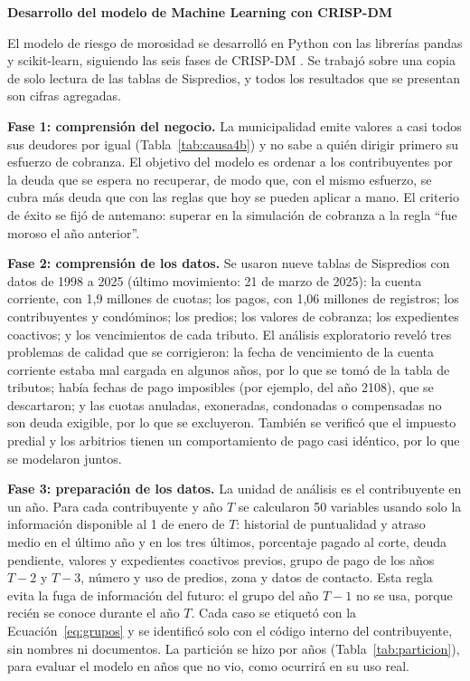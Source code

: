 \documentclass[12pt,a4paper]{report}
\newcommand{\subtitulo}[1]{\par\vspace{4pt}\noindent\textbf{#1}\par}
\begin{document}
\subtitulo{Desarrollo del modelo de Machine Learning con CRISP-DM}
\label{sec:crisp}

El modelo de riesgo de morosidad se desarrolló en Python con las librerías pandas y scikit-learn, siguiendo las seis fases de CRISP-DM \parencite{chapman2000}. Se trabajó sobre una copia de solo lectura de las tablas de Sispredios, y todos los resultados que se presentan son cifras agregadas.

\noindent\textbf{Fase 1: comprensión del negocio.} La municipalidad emite valores a casi todos sus deudores por igual (Tabla~\ref{tab:causa4b}) y no sabe a quién dirigir primero su esfuerzo de cobranza. El objetivo del modelo es ordenar a los contribuyentes por la deuda que se espera no recuperar, de modo que, con el mismo esfuerzo, se cubra más deuda que con las reglas que hoy se pueden aplicar a mano. El criterio de éxito se fijó de antemano: superar en la simulación de cobranza a la regla ``fue moroso el año anterior''.

\noindent\textbf{Fase 2: comprensión de los datos.} Se usaron nueve tablas de Sispredios con datos de 1998 a 2025 (último movimiento: 21 de marzo de 2025): la cuenta corriente, con 1,9 millones de cuotas; los pagos, con 1,06 millones de registros; los contribuyentes y condóminos; los predios; los valores de cobranza; los expedientes coactivos; y los vencimientos de cada tributo. El análisis exploratorio reveló tres problemas de calidad que se corrigieron: la fecha de vencimiento de la cuenta corriente estaba mal cargada en algunos años, por lo que se tomó de la tabla de tributos; había fechas de pago imposibles (por ejemplo, del año 2108), que se descartaron; y las cuotas anuladas, exoneradas, condonadas o compensadas no son deuda exigible, por lo que se excluyeron. También se verificó que el impuesto predial y los arbitrios tienen un comportamiento de pago casi idéntico, por lo que se modelaron juntos.

\noindent\textbf{Fase 3: preparación de los datos.} La unidad de análisis es el contribuyente en un año. Para cada contribuyente y año $T$ se calcularon 50 variables usando solo la información disponible al 1 de enero de $T$: historial de puntualidad y atraso medio en el último año y en los tres últimos, porcentaje pagado al corte, deuda pendiente, valores y expedientes coactivos previos, grupo de pago de los años $T-2$ y $T-3$, número y uso de predios, zona y datos de contacto. Esta regla evita la fuga de información del futuro: el grupo del año $T-1$ no se usa, porque recién se conoce durante el año $T$. Cada caso se etiquetó con la Ecuación~\eqref{eq:grupos} y se identificó solo con el código interno del contribuyente, sin nombres ni documentos. La partición se hizo por años (Tabla~\ref{tab:particion}), para evaluar el modelo en años que no vio, como ocurrirá en su uso real.
\end{document}
